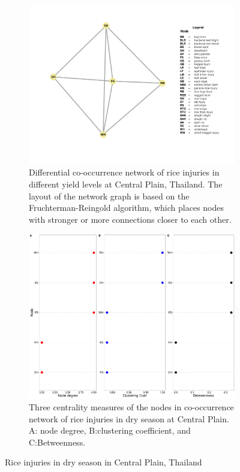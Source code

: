 \begin{figure}
    \centering
    \begin{subfigure}[b]{1\textwidth}
        \includegraphics[width = 1\textwidth]{figures/difyieldOD.pdf}
        \caption{Differential co-occurrence network of rice injuries in different yield levels at Central Plain, Thailand. The layout of the network graph is based on the Fruchterman-Reingold algorithm, which places nodes with stronger or more connections closer to each other.}
        \label{fig:networkCP_ds}
    \end{subfigure}
    \begin{subfigure}[b]{1\textwidth}
        \includegraphics[width = 1\textwidth]{figures/yield_dif_nodepropOdisha.pdf}
        \caption{Three centrality measures of the nodes in co-occurrence network of rice injuries in dry season at Central Plain. A: node degree, B:clustering coefficient, and C:Betweenness.}
        \label{fig:nodepropCP_ds}
    \end{subfigure}
    \caption{Rice injuries in dry season in Central Plain, Thailand}
    \label{fig:CP_ds}
\end{figure}
 
